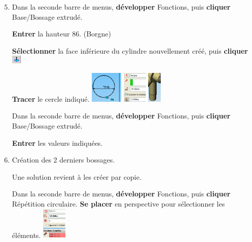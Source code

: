 \begin{enumerate}
\setcounter{enumi}{4}
 \item  Dans la seconde barre de menus, \textbf{développer} Fonctions, puis \textbf{cliquer} Base/Bossage extrudé. 

\textbf{Entrer} la hauteur 86. (Borgne) 

\textbf{Sélectionner} la face inférieure du cylindre nouvellement créé, puis \textbf{cliquer} \includegraphics[height=0.4cm]{img/SW-029.png}

\textbf{Tracer} le cercle indiqué. 
\includegraphics[height=1.5cm]{img/SW-030.png} 
\includegraphics[height=1.5cm]{img/SW-031.png}
\includegraphics[height=1.5cm]{img/SW-032.png}

Dans la seconde barre de menus, \textbf{développer} Fonctions, puis  \textbf{cliquer} Base/Bossage extrudé. 

 \textbf{Entrer} les valeurs indiquées. 

\end{enumerate}


\begin{enumerate}
\setcounter{enumi}{5}
 \item   Création des 2 derniers bossages. 

Une solution revient à les créer par copie. 

Dans la seconde barre de menus, \textbf{développer} Fonctions, puis \textbf{cliquer} Répétition circulaire. 
\textbf{Se placer} en perspective pour sélectionner les éléments. 
 \includegraphics[height=1.5cm]{img/SW-033.png} 
\end{enumerate}

